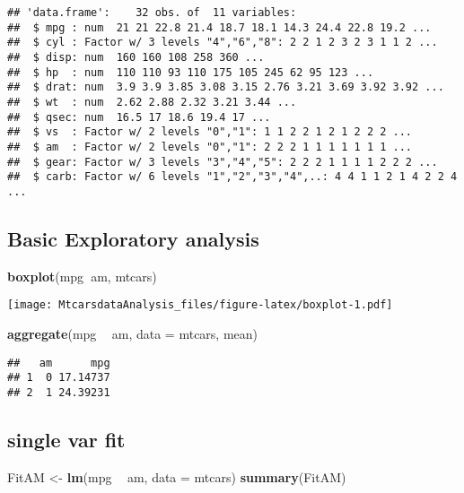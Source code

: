 \documentclass[
]{article}
\newenvironment{Shaded}{\begin{snugshade}}{\end{snugshade}}
\newcommand{\DataTypeTok}[1]{\textcolor[rgb]{0.13,0.29,0.53}{#1}}
\newcommand{\KeywordTok}[1]{\textcolor[rgb]{0.13,0.29,0.53}{\textbf{#1}}}
\newcommand{\NormalTok}[1]{#1}
\newcommand{\OperatorTok}[1]{\textcolor[rgb]{0.81,0.36,0.00}{\textbf{#1}}}
\newcommand{\StringTok}[1]{\textcolor[rgb]{0.31,0.60,0.02}{#1}}
\begin{document}
\begin{verbatim}
## 'data.frame':    32 obs. of  11 variables:
##  $ mpg : num  21 21 22.8 21.4 18.7 18.1 14.3 24.4 22.8 19.2 ...
##  $ cyl : Factor w/ 3 levels "4","6","8": 2 2 1 2 3 2 3 1 1 2 ...
##  $ disp: num  160 160 108 258 360 ...
##  $ hp  : num  110 110 93 110 175 105 245 62 95 123 ...
##  $ drat: num  3.9 3.9 3.85 3.08 3.15 2.76 3.21 3.69 3.92 3.92 ...
##  $ wt  : num  2.62 2.88 2.32 3.21 3.44 ...
##  $ qsec: num  16.5 17 18.6 19.4 17 ...
##  $ vs  : Factor w/ 2 levels "0","1": 1 1 2 2 1 2 1 2 2 2 ...
##  $ am  : Factor w/ 2 levels "0","1": 2 2 2 1 1 1 1 1 1 1 ...
##  $ gear: Factor w/ 3 levels "3","4","5": 2 2 2 1 1 1 1 2 2 2 ...
##  $ carb: Factor w/ 6 levels "1","2","3","4",..: 4 4 1 1 2 1 4 2 2 4 ...
\end{verbatim}

\hypertarget{basic-exploratory-analysis}{%
\subsection{Basic Exploratory
analysis}\label{basic-exploratory-analysis}}

\begin{Shaded}
\begin{Highlighting}[]
\KeywordTok{boxplot}\NormalTok{(mpg}\OperatorTok{~}\NormalTok{am, mtcars)}
\end{Highlighting}
\end{Shaded}

\texttt{[image: MtcarsdataAnalysis\_files/figure-latex/boxplot-1.pdf]}

\begin{Shaded}
\begin{Highlighting}[]
\KeywordTok{aggregate}\NormalTok{(mpg }\OperatorTok{~}\StringTok{ }\NormalTok{am, }\DataTypeTok{data =}\NormalTok{ mtcars, mean)}
\end{Highlighting}
\end{Shaded}

\begin{verbatim}
##   am      mpg
## 1  0 17.14737
## 2  1 24.39231
\end{verbatim}

\hypertarget{single-var-fit}{%
\subsection{single var fit}\label{single-var-fit}}

\begin{Shaded}
\begin{Highlighting}[]
\NormalTok{FitAM <-}\StringTok{ }\KeywordTok{lm}\NormalTok{(mpg }\OperatorTok{~}\StringTok{ }\NormalTok{am, }\DataTypeTok{data =}\NormalTok{ mtcars)}
\KeywordTok{summary}\NormalTok{(FitAM)}
\end{Highlighting}
\end{Shaded}
\end{document}
